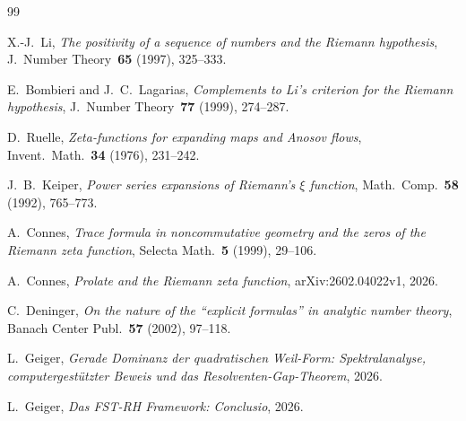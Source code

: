 \documentclass[12pt,a4paper]{article}
\theoremstyle{definition}
\theoremstyle{remark}
\begin{document}
\begin{thebibliography}{99}

X.-J.~Li, \emph{The positivity of a sequence of numbers and the Riemann hypothesis}, J.~Number Theory~\textbf{65} (1997), 325--333.

E.~Bombieri and J.~C.~Lagarias, \emph{Complements to Li's criterion for the Riemann hypothesis}, J.~Number Theory~\textbf{77} (1999), 274--287.

D.~Ruelle, \emph{Zeta-functions for expanding maps and Anosov flows}, Invent.~Math.~\textbf{34} (1976), 231--242.

J.~B.~Keiper, \emph{Power series expansions of Riemann's $\xi$ function}, Math.~Comp.~\textbf{58} (1992), 765--773.

A.~Connes, \emph{Trace formula in noncommutative geometry and the zeros of the Riemann zeta function}, Selecta Math.~\textbf{5} (1999), 29--106.

A.~Connes, \emph{Prolate and the Riemann zeta function}, arXiv:2602.04022v1, 2026.

C.~Deninger, \emph{On the nature of the ``explicit formulas'' in analytic number theory}, Banach Center Publ.~\textbf{57} (2002), 97--118.

L.~Geiger, \emph{Gerade Dominanz der quadratischen Weil-Form: Spektralanalyse, computergestützter Beweis und das Resolventen-Gap-Theorem}, 2026.

L.~Geiger, \emph{Das FST-RH Framework: Conclusio}, 2026.

\end{thebibliography}
\end{document}
